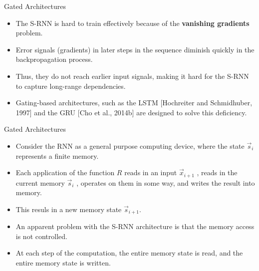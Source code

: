 \documentclass[handout]{beamer}
\begin{document}
\begin{frame}{Gated Architectures}
\begin{scriptsize}
\begin{itemize}
\item The S-RNN is hard to train effectively because of the \textbf{vanishing gradients} problem.
\item Error signals (gradients) in later steps in the sequence diminish quickly in the backpropagation process.
\item Thus, they do not reach earlier input signals, making it hard for the S-RNN to capture long-range dependencies.
\item Gating-based architectures, such as the LSTM [Hochreiter
and Schmidhuber, 1997] and the GRU [Cho et al., 2014b] are designed to solve this deficiency.
\end{itemize}
\end{scriptsize}
\end{frame}


\begin{frame}{Gated Architectures}
\begin{scriptsize}
\begin{itemize}
\item Consider the RNN as a general purpose computing device, where the state $\vec{s}_i$ represents a finite memory.
\item Each application of the function $R$ reads in an input $\vec{x}_{i+1}$ , reads in the current memory $\vec{s}_i$ , operates on them in some way, and writes the result into memory.
\item This resuls in a new memory state $\vec{s}_{i+1}$.
\item An apparent problem with the S-RNN architecture is that the memory access is not controlled. 
\item At each step of the computation, the entire memory state is read, and the entire memory state is written.
\end{itemize}
\end{scriptsize}
\end{frame}
\end{document}
